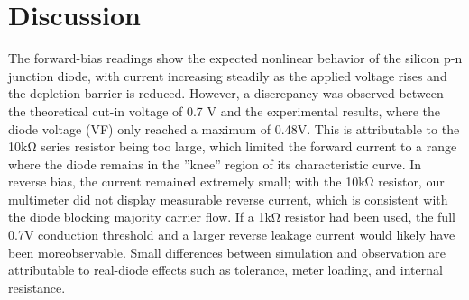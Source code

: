 \section{Discussion}

The forward-bias readings show the expected nonlinear behavior of the silicon p-n junction
diode, with current increasing steadily as the applied voltage rises and the depletion barrier
is reduced. However, a discrepancy was observed between the theoretical cut-in voltage of
0.7 V and the experimental results, where the diode voltage (VF) only reached a maximum
of 0.48V. This is attributable to the 10kΩ series resistor being too large, which limited the
forward current to a range where the diode remains in the ”knee” region of its characteristic
curve. In reverse bias, the current remained extremely small; with the 10kΩ resistor, our
multimeter did not display measurable reverse current, which is consistent with the diode
blocking majority carrier flow. If a 1kΩ resistor had been used, the full 0.7V conduction
threshold and a larger reverse leakage current would likely have been moreobservable. Small
differences between simulation and observation are attributable to real-diode effects such as
tolerance, meter loading, and internal resistance.
